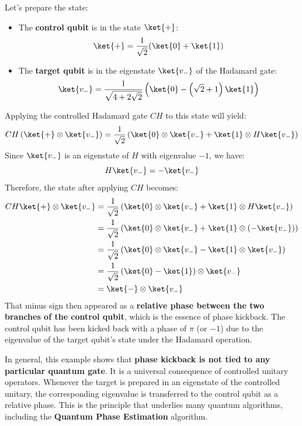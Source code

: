 \highspace
\begin{examplebox}
    Let's prepare the state:
    \begin{itemize}
        \item The \textbf{control qubit} is in the state $\ket{+}$:
        \begin{equation*}
            \ket{+} = \frac{1}{\sqrt{2}}(\ket{0} + \ket{1})
        \end{equation*}
        \item The \textbf{target qubit} is in the eigenstate $\ket{v_-}$ of the Hadamard gate:
        \begin{equation*}
            \ket{v_-} = \frac{1}{\sqrt{4+2\sqrt{2}}} \left(\ket{0} - \left(\sqrt{2} + 1\right)\ket{1}\right)
        \end{equation*}
    \end{itemize}
    Applying the controlled Hadamard gate $CH$ to this state will yield:
    \begin{equation*}
        CH \left(\ket{+} \otimes \ket{v_-}\right) = \frac{1}{\sqrt{2}} \left(\ket{0} \otimes \ket{v_-} + \ket{1} \otimes H\ket{v_-}\right)
    \end{equation*}
    Since $\ket{v_-}$ is an eigenstate of $H$ with eigenvalue $-1$, we have:
    \begin{equation*}
        H\ket{v_-} = -\ket{v_-}
    \end{equation*}
    Therefore, the state after applying $CH$ becomes:
    \begin{equation*}
        \begin{aligned}
            CH \ket{+} \otimes \ket{v_-} &= \frac{1}{\sqrt{2}} \left(\ket{0} \otimes \ket{v_-} + \ket{1} \otimes H \ket{v_-}\right) \\
            &= \frac{1}{\sqrt{2}} \left(\ket{0} \otimes \ket{v_-} + \ket{1} \otimes (-\ket{v_-})\right) \\
            &= \frac{1}{\sqrt{2}} \left(\ket{0} \otimes \ket{v_-} - \ket{1} \otimes \ket{v_-}\right) \\
            &= \frac{1}{\sqrt{2}} \left(\ket{0} - \ket{1}\right) \otimes \ket{v_-} \\
            &= \ket{-} \otimes \ket{v_-}
        \end{aligned}
    \end{equation*}
    That minus sign then appeared as a \textbf{relative phase between the two branches of the control qubit}, which is the essence of phase kickback. The control qubit has been kicked back with a phase of $\pi$ (or $-1$) due to the eigenvalue of the target qubit's state under the Hadamard operation.
\end{examplebox}

\highspace
In general, this example shows that \textbf{phase kickback is not tied to any particular quantum gate}. It is a universal consequence of controlled unitary operators. Whenever the target is prepared in an eigenstate of the controlled unitary, the corresponding eigenvalue is transferred to the control qubit as a relative phase. This is the principle that underlies many quantum algorithms, including the \textbf{Quantum Phase Estimation} algorithm.